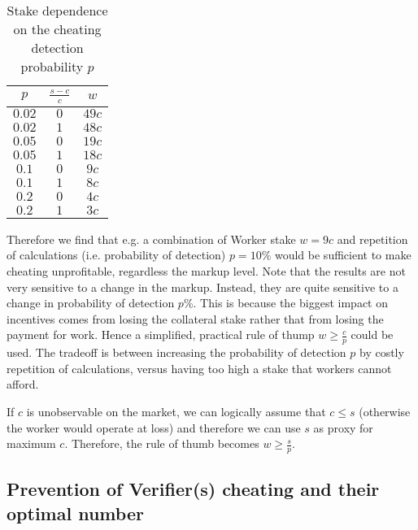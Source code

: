 \documentclass[conference]{IEEEtran}
\begin{document}
\begin{table}[ht]
    \caption{Stake dependence on the cheating detection probability $p$}
    \label{table:stakes}
    \begin{adjustbox}{center}
        \begin{tabular}{c c c}
            \toprule
            $p$ & $\frac{s-c}{c}$ & $w$ \\
            \midrule
            $0.02$ & $0$ & $49c$ \\
            $0.02$ & $1$ & $48c$ \\
            $0.05$ & $0$ & $19c$ \\
            $0.05$ & $1$ & $18c$ \\
            $0.1$ & $0$ & $9c$ \\
            $0.1$ & $1$ & $8c$ \\
            $0.2$ & $0$ & $4c$ \\
            $0.2$ & $1$ & $3c$ \\
            \bottomrule
        \end{tabular}
    \end{adjustbox}
\end{table}

Therefore we find that e.g. a combination of Worker stake $w=9c$ and repetition of calculations (i.e. probability of detection) $p=10\%$ would be sufficient to make cheating unprofitable, regardless the markup level. Note that the results are not very sensitive to a change in the markup. Instead, they are quite sensitive to a change in probability of detection $p$\%. This is because the biggest impact on incentives comes from losing the collateral stake rather that from losing the payment for work. Hence a simplified, practical rule of thump $w\geq \frac{c}{p}$ could be used. The tradeoff is between increasing the probability of detection $p$ by costly repetition of calculations, versus having too high a stake that workers cannot afford.

If $c$ is unobservable on the market, we can logically assume that $c\leq s$ (otherwise the worker would operate at loss) and therefore we can use $s$ as proxy for maximum $c$. Therefore, the rule of thumb becomes $w\geq \frac{s}{p}$.

\subsection{Prevention of Verifier(s) cheating and their optimal number}
\end{document}
